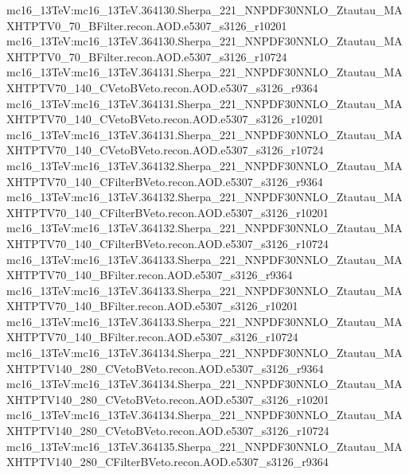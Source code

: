 { mc16\_13TeV:mc16\_13TeV.364130.Sherpa\_221\_NNPDF30NNLO\_Ztautau\_MAXHTPTV0\_70\_BFilter.recon.AOD.e5307\_s3126\_r10201   \newline 
 mc16\_13TeV:mc16\_13TeV.364130.Sherpa\_221\_NNPDF30NNLO\_Ztautau\_MAXHTPTV0\_70\_BFilter.recon.AOD.e5307\_s3126\_r10724   
 mc16\_13TeV:mc16\_13TeV.364131.Sherpa\_221\_NNPDF30NNLO\_Ztautau\_MAXHTPTV70\_140\_CVetoBVeto.recon.AOD.e5307\_s3126\_r9364   \newline 
 mc16\_13TeV:mc16\_13TeV.364131.Sherpa\_221\_NNPDF30NNLO\_Ztautau\_MAXHTPTV70\_140\_CVetoBVeto.recon.AOD.e5307\_s3126\_r10201 \newline 
 mc16\_13TeV:mc16\_13TeV.364131.Sherpa\_221\_NNPDF30NNLO\_Ztautau\_MAXHTPTV70\_140\_CVetoBVeto.recon.AOD.e5307\_s3126\_r10724 \newline   
 mc16\_13TeV:mc16\_13TeV.364132.Sherpa\_221\_NNPDF30NNLO\_Ztautau\_MAXHTPTV70\_140\_CFilterBVeto.recon.AOD.e5307\_s3126\_r9364 \newline   
 mc16\_13TeV:mc16\_13TeV.364132.Sherpa\_221\_NNPDF30NNLO\_Ztautau\_MAXHTPTV70\_140\_CFilterBVeto.recon.AOD.e5307\_s3126\_r10201  \newline  
 mc16\_13TeV:mc16\_13TeV.364132.Sherpa\_221\_NNPDF30NNLO\_Ztautau\_MAXHTPTV70\_140\_CFilterBVeto.recon.AOD.e5307\_s3126\_r10724\newline    
 mc16\_13TeV:mc16\_13TeV.364133.Sherpa\_221\_NNPDF30NNLO\_Ztautau\_MAXHTPTV70\_140\_BFilter.recon.AOD.e5307\_s3126\_r9364 \newline   
 mc16\_13TeV:mc16\_13TeV.364133.Sherpa\_221\_NNPDF30NNLO\_Ztautau\_MAXHTPTV70\_140\_BFilter.recon.AOD.e5307\_s3126\_r10201\newline    
 mc16\_13TeV:mc16\_13TeV.364133.Sherpa\_221\_NNPDF30NNLO\_Ztautau\_MAXHTPTV70\_140\_BFilter.recon.AOD.e5307\_s3126\_r10724   \newline 
 mc16\_13TeV:mc16\_13TeV.364134.Sherpa\_221\_NNPDF30NNLO\_Ztautau\_MAXHTPTV140\_280\_CVetoBVeto.recon.AOD.e5307\_s3126\_r9364  \newline  
 mc16\_13TeV:mc16\_13TeV.364134.Sherpa\_221\_NNPDF30NNLO\_Ztautau\_MAXHTPTV140\_280\_CVetoBVeto.recon.AOD.e5307\_s3126\_r10201 \newline  
 mc16\_13TeV:mc16\_13TeV.364134.Sherpa\_221\_NNPDF30NNLO\_Ztautau\_MAXHTPTV140\_280\_CVetoBVeto.recon.AOD.e5307\_s3126\_r10724 \newline   
 mc16\_13TeV:mc16\_13TeV.364135.Sherpa\_221\_NNPDF30NNLO\_Ztautau\_MAXHTPTV140\_280\_CFilterBVeto.recon.AOD.e5307\_s3126\_r9364\newline   
}

